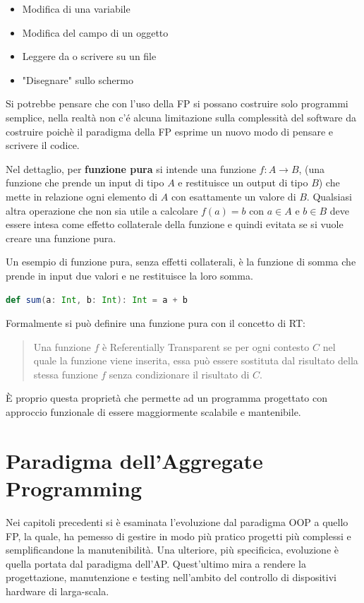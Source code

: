 \documentclass[12pt,a4paper,openright,twoside]{book}
\begin{document}
\begin{itemize}
    \item Modifica di una variabile
    \item Modifica del campo di un oggetto
    \item Leggere da o scrivere su un file
    \item "Disegnare" sullo schermo
\end{itemize}

Si potrebbe pensare che con l'uso della \ac{FP} si possano costruire solo programmi semplice, nella realtà non c'é alcuna limitazione sulla complessità del software da costruire poichè il paradigma della FP esprime un nuovo modo di pensare e scrivere il codice.

Nel dettaglio, per \textbf{funzione pura} si intende una funzione $f:A\to B$, (una funzione che prende un input di tipo $A$ e restituisce un output di tipo $B$) che mette in relazione ogni elemento di $A$ con esattamente un valore di $B$. Qualsiasi altra operazione che non sia utile a calcolare $f(a)=b$ con $a\in A$ e $b\in B$ deve essere intesa come effetto collaterale della funzione e quindi evitata se si vuole creare una funzione pura.

Un esempio di funzione pura, senza effetti collaterali, è la funzione di somma che prende in input due valori e ne restituisce la loro somma. 

\begin{lstlisting}[language=Scala]
    def sum(a: Int, b: Int): Int = a + b
\end{lstlisting}

Formalmente si può definire una funzione pura con il concetto di \ac{RT}:

\begin{quote}
    Una funzione $f$ è Referentially Transparent se per ogni contesto $C$ nel quale la funzione viene inserita, essa può essere sostituta dal risultato della stessa funzione $f$ senza condizionare il risultato di $C$.
\end{quote}

È proprio questa proprietà che permette ad un programma progettato con approccio funzionale di essere maggiormente scalabile e mantenibile.

\section{Paradigma dell'Aggregate Programming}

Nei capitoli precedenti si è esaminata l'evoluzione dal paradigma \ac{OOP} a quello \ac{FP}, la quale, ha pemesso di gestire in modo più pratico progetti più complessi e semplificandone la manutenibilità. Una ulteriore, più specificica, evoluzione è quella portata dal paradigma dell'\ac{AP}. Quest'ultimo mira a rendere la progettazione, manutenzione e testing nell'ambito del controllo di dispositivi hardware di larga-scala.
\end{document}
